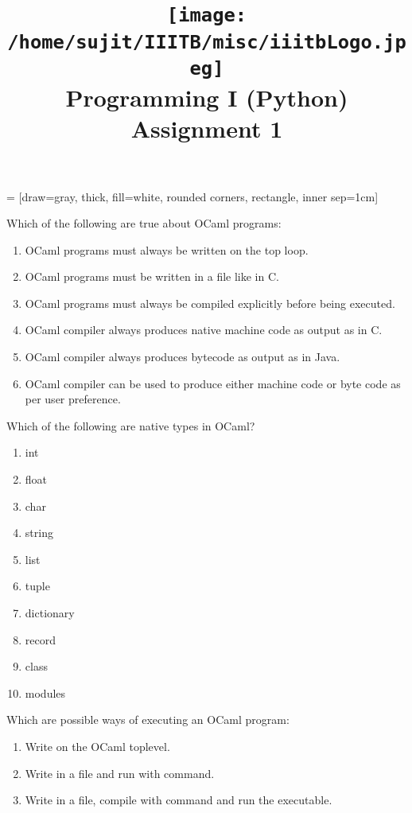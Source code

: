 \documentclass[addpoints,11pt]{exam}
\author{}
\title{\texttt{[image: /home/sujit/IIITB/misc/iiitbLogo.jpeg]} \\ Programming I (Python) \\ Assignment 1}
\date{}
\begin{document}
   = [draw=gray, thick, fill=white, rounded corners, rectangle, inner sep=1cm]
\maketitle


\thispagestyle{head}
\begin{questions}
\question Which of the following are true about OCaml programs:
\begin{enumerate}
\item OCaml programs must always be written on the top loop.
\item OCaml programs must be written in a file like in C.
\item OCaml programs must always be compiled explicitly before being executed.
\item OCaml compiler always produces native machine code as output as in C.
\item OCaml compiler always produces bytecode as output as in Java.
\item OCaml compiler can be used to produce either machine code or byte code as per user preference.
\end{enumerate}\question Which of the following are native types in OCaml?
\begin{enumerate}
\item int
\item float
\item char
\item string
\item list
\item tuple
\item dictionary
\item record
\item class
\item modules
\end{enumerate}\question Which are possible ways of executing an OCaml program:
\begin{enumerate}
\item Write on the OCaml toplevel.
\item Write in a file and run with \lstinline@ocaml@ command.
\item Write in a file, compile with \lstinline@ocamlc@ command and run the executable.

\end{enumerate}
\end{questions}
\end{document}
